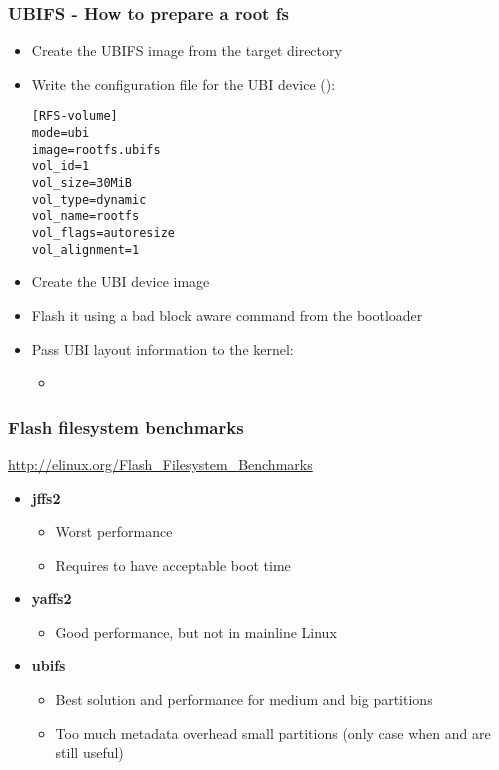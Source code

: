 \begin{frame}[fragile]
  \frametitle{UBIFS - How to prepare a root fs}
  \begin{itemize}
  \item Create the UBIFS image from the target directory
  \item Write the configuration file for the UBI device ():
\small
\begin{verbatim}
[RFS-volume]
mode=ubi
image=rootfs.ubifs
vol_id=1
vol_size=30MiB
vol_type=dynamic
vol_name=rootfs
vol_flags=autoresize
vol_alignment=1
\end{verbatim}
\normalsize
  \item Create the UBI device image
  \item Flash it using a bad block aware command from the bootloader
  \item Pass UBI layout information to the kernel:
    \begin{itemize}
    \item {}
    \end{itemize}
  \end{itemize}
\end{frame}

\begin{frame}
  \frametitle{Flash filesystem benchmarks}
  \url{http://elinux.org/Flash_Filesystem_Benchmarks}
  \begin{itemize}
  \item {\bf jffs2}
    \begin{itemize}
    \item Worst performance
    \item Requires  to have acceptable boot time
    \end{itemize}
  \item {\bf yaffs2}
    \begin{itemize}
    \item Good performance, but not in mainline Linux
    \end{itemize}
  \item {\bf ubifs}
    \begin{itemize}
    \item Best solution and performance for medium and big
      partitions
    \item Too much metadata overhead small partitions (only case
      when  and  are still useful)
    \end{itemize}
  \end{itemize}
\end{frame}

